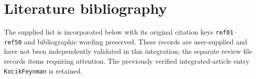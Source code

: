 \documentclass[11pt,oneside]{amsbook}
\theoremstyle{definition}
\theoremstyle{remark}
\begin{document}
\section*{Literature bibliography}
The supplied list is incorporated below with its original citation keys
\texttt{ref01}--\texttt{ref50} and bibliographic wording preserved.
These records are user-supplied and have not been independently
validated in this integration; the separate review file records items
requiring attention. The previously verified integrated-article entry
\texttt{KocikFeynman} is retained.

\end{document}
